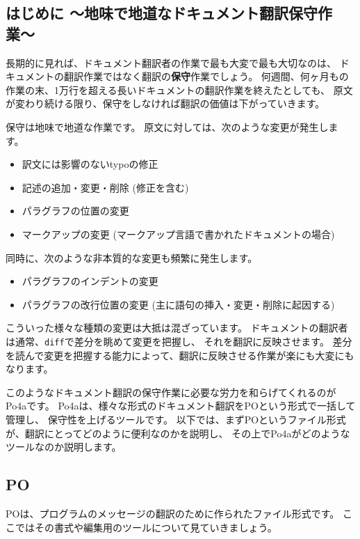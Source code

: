 \documentclass[mingoth,a4paper]{jsarticle}
\begin{document}
\subsection{はじめに 〜地味で地道なドキュメント翻訳保守作業〜}

長期的に見れば、ドキュメント翻訳者の作業で最も大変で最も大切なのは、
ドキュメントの翻訳作業ではなく翻訳の{\bf 保守}作業でしょう。
何週間、何ヶ月もの作業の末、1万行を超える長いドキュメントの翻訳作業を終えたとしても、
原文が変わり続ける限り、保守をしなければ翻訳の価値は下がっていきます。

保守は地味で地道な作業です。
原文に対しては、次のような変更が発生します。

\begin{itemize}
 \item 訳文には影響のないtypoの修正
 \item 記述の追加・変更・削除 (修正を含む)
 \item パラグラフの位置の変更
 \item マークアップの変更 (マークアップ言語で書かれたドキュメントの場合)
\end{itemize}

同時に、次のような非本質的な変更も頻繁に発生します。

\begin{itemize}
 \item パラグラフのインデントの変更
 \item パラグラフの改行位置の変更 (主に語句の挿入・変更・削除に起因する)
\end{itemize}

こういった様々な種類の変更は大抵は混ざっています。
ドキュメントの翻訳者は通常、\texttt{diff}で差分を眺めて変更を把握し、
それを翻訳に反映させます。
差分を読んで変更を把握する能力によって、翻訳に反映させる作業が楽にも大変にもなります。


このようなドキュメント翻訳の保守作業に必要な労力を和らげてくれるのがPo4aです。
Po4aは、様々な形式のドキュメント翻訳をPOという形式で一括して管理し、
保守性を上げるツールです。
以下では、まずPOというファイル形式が、翻訳にとってどのように便利なのかを説明し、
その上でPo4aがどのようなツールなのか説明します。

\subsection{PO}

POは、プログラムのメッセージの翻訳のために作られたファイル形式です。
ここではその書式や編集用のツールについて見ていきましょう。
\end{document}
